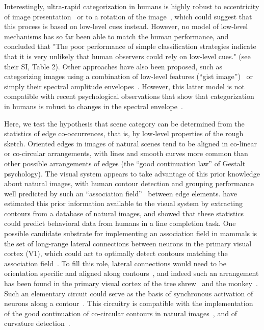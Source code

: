 \documentclass[a4paper]{article}
\begin{document}
Interestingly, ultra-rapid categorization in humans is highly robust 
to eccentricity of image presentation~\autocite{Thorpe01} 
or to a rotation of the image~\autocite{Crouzet11b}, 
which could suggest that this process is based on low-level cues instead.  
However, no model of low-level mechanisms has so far been able to match the human performance, 
and \textcite{Serre07} concluded that "The poor performance of simple classification strategies indicate 
that it is very unlikely that human observers could rely on low-level cues." (see their SI, Table 2).  
Other approaches have also been proposed, such as categorizing images
using a combination of low-level features (``gist image'')~\autocite{Siagian06} or simply their spectral amplitude envelopes~\autocite{Torralba03,Oliva01}. 
However, this latter model is not compatible with recent psychological observations 
that show that categorization in humans is robust to changes in the spectral envelope~\autocite{Gaspar09}.

Here, we test the hypothesis that scene category can be determined 
from the statistics of edge co-occurrences, that is, by low-level properties of the rough sketch. 
Oriented edges in images of natural scenes tend to be aligned in co-linear or co-circular arrangements, 
with lines and smooth curves more common than other possible arrangements of edges 
(the ``good continuation law'' of Gestalt psychology). 
The visual system appears to take advantage of this prior knowledge about natural images, 
with human contour detection and grouping performance well predicted 
by such an ``association field''~\autocite{Field93} between edge elements. 
\Textcite{Geisler01} have estimated this prior information available
to the visual system by extracting contours from a database of natural
images, and showed that these statistics could predict behavioral data
from humans in a line completion task.
One possible candidate substrate for implementing an association field in mammals is
the set of long-range lateral connections between neurons in the primary visual cortex (V1), 
which could act to optimally detect contours matching the association field~\autocite{Hunt11}. %
To fill this role, lateral connections would need to be orientation specific 
and aligned along contours~\autocite{Hess03}, and
indeed such an arrangement has been found in the primary visual cortex 
of the tree shrew~\autocite{Bosking97,Hunt11} and the monkey~\autocite{Sincich01}. 
Such an elementary circuit could serve as the basis of synchronous activation of neurons
along a contour~\autocite{Samonds06}. 
This circuitry is compatible with the implementation of the good continuation of co-circular contours in natural images~\autocite{Sigman01}, and of curvature detection~\autocite{Parent89}. %
\end{document}
